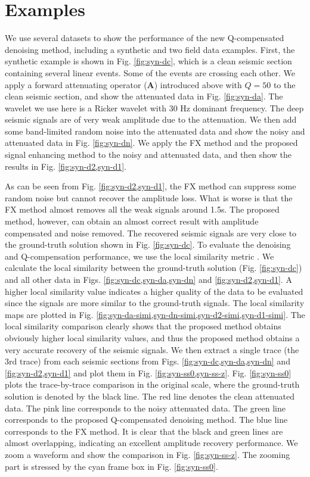 \section{Examples}
We use several datasets to show the performance of the new Q-compensated denoising method, including a synthetic and two field data examples. First, the synthetic example is shown in Fig. \ref{fig:syn-dc}, which is a clean seismic section containing several linear events. Some of the events are crossing each other. We apply a forward attenuating operator ($\mathbf{A}$) introduced above with $Q=50$ to the clean seismic section, and show the attenuated data in Fig. \ref{fig:syn-da}. The wavelet we use here is a Ricker wavelet with 30 Hz dominant frequency. The deep seismic signals are of very weak amplitude due to the attenuation. We then add some band-limited random noise into the attenuated data and show the noisy and attenuated data in Fig. \ref{fig:syn-dn}. We apply the FX method \cite[]{canales1984} and the proposed signal enhancing method to the noisy and attenuated data, and then show the results in Fig. \ref{fig:syn-d2,syn-d1}. 

As can be seen from Fig. \ref{fig:syn-d2,syn-d1}, the FX method can suppress some random noise but cannot recover the amplitude loss. What is worse is that the FX method almost removes all the weak signals around 1.5s. The proposed method, however, can obtain an almost correct result with amplitude compensated and noise removed. The recovered seismic signals are very close to the ground-truth solution shown in Fig. \ref{fig:syn-dc}. To evaluate the denoising and Q-compensation performance, we use the local similarity metric \cite[]{fomel2007localattr,yangkang2015ortho}. We calculate the local similarity between the ground-truth solution (Fig. \ref{fig:syn-dc}) and all other data in Figs. \ref{fig:syn-dc,syn-da,syn-dn} and \ref{fig:syn-d2,syn-d1}. A higher local similarity value indicates a higher quality of the data to be evaluated since the signals are more similar to the ground-truth signals. The local similarity maps are plotted in Fig. \ref{fig:syn-da-simi,syn-dn-simi,syn-d2-simi,syn-d1-simi}. The local similarity comparison clearly shows that the proposed method obtains obviously higher local similarity values, and thus the proposed method obtains a very accurate recovery of the seismic signals. We then extract a single trace (the 3rd trace) from each seismic sections from Figs. \ref{fig:syn-dc,syn-da,syn-dn} and \ref{fig:syn-d2,syn-d1} and plot them in Fig. \ref{fig:syn-ss0,syn-ss-z}. Fig. \ref{fig:syn-ss0} plots the trace-by-trace comparison in the original scale, where the ground-truth solution is denoted by the black line. The red line denotes the clean attenuated data. The pink line corresponds to the noisy attenuated data.  The green line corresponds to the proposed Q-compensated denoising method. The blue line corresponds to the FX method. It is clear that the black and green lines are almost overlapping, indicating an excellent amplitude recovery performance. We zoom a waveform and show the comparison in Fig. \ref{fig:syn-ss-z}. The zooming part is stressed by the cyan frame box in Fig. \ref{fig:syn-ss0}. 


